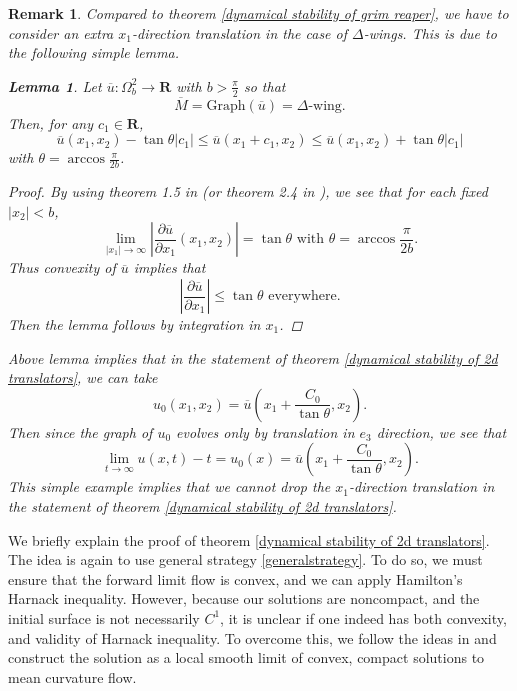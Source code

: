 \documentclass[pdflatex,sn-mathphys-num]{sn-jnl}%
\newtheorem{lemma}[theorem]{Lemma}
\newtheorem{remark}[theorem]{Remark}
\begin{document}
\begin{remark}\label{extra x1 translation}
Compared to theorem \ref{dynamical stability of grim reaper}, we have to consider an extra $x_1$-direction translation in the case of $\Delta$-wings. This is due to the following simple lemma. 
\begin{lemma}
    Let $\overline{u} : \Omega_b^2 \to \mathbf{R}$ with $b > \frac{\pi}{2}$ so that 
    \begin{equation}
        \overline{M} = \text{Graph}(\overline{u}) = \Delta \text{-wing}.
    \end{equation}
    Then, for any $c_1 \in \mathbf{R}$, 
    \begin{equation}
        \overline{u}(x_1, x_2) - \tan\theta|c_1| \leq \overline{u}(x_1 + c_1,x_2) \leq \overline{u}(x_1, x_2) + \tan\theta|c_1|
    \end{equation}
    with $\theta = \arccos\frac{\pi}{2b}$.
\end{lemma}
\begin{proof}
    By using theorem 1.5 in \cite{spruck2020complete} (or theorem 2.4 in \cite{Hoffman2018GraphicalTF}), we see that for each fixed $|x_2| < b$, 
\begin{equation}
    \lim_{|x_1| \to \infty}|\frac{\partial \overline{u}}{\partial x_1}(x_1, x_2)| = \tan\theta \text{ with }\theta = \arccos\frac{\pi}{2b}.
\end{equation}
Thus convexity of $\overline{u}$ implies that
\begin{equation}
    |\frac{\partial \overline{u}}{\partial x_1}| \leq \tan\theta \text{ everywhere}.
\end{equation}
Then the lemma follows by integration in $x_1$. 
\end{proof}
Above lemma implies that in the statement of theorem \ref{dynamical stability of 2d translators}, we can take
\begin{equation}
    u_0(x_1, x_2) = \overline{u}(x_1 + \frac{C_0}{\tan \theta}, x_2).
\end{equation}
Then since the graph of $u_0$ evolves only by translation in $e_3$ direction, we see that
\begin{equation}
    \lim_{t \to \infty}u(x,t) - t = u_0(x) = \overline{u}(x_1 + \frac{C_0}{\tan\theta}, x_2).
\end{equation}
This simple example implies that we cannot drop the $x_1$-direction translation in the statement of theorem \ref{dynamical stability of 2d translators}.
\end{remark}
We briefly explain the proof of theorem \ref{dynamical stability of 2d translators}. The idea is again to use general strategy \ref{generalstrategy}. To do so, we must ensure that the forward limit flow is convex, and we can apply Hamilton's Harnack inequality. However, because our solutions are noncompact, and the initial surface is not necessarily $C^1$, it is unclear if one indeed has both convexity, and validity of Harnack inequality. To overcome this, we follow the ideas in \cite{Daskalopoulos2021UniquenessOE} and construct the solution as a local smooth limit of convex, compact solutions to mean curvature flow. \\
\end{document}
